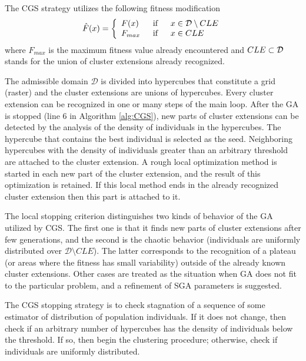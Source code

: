 The CGS strategy utilizes the following fitness modification
\begin{equation}
\label{eqn:FitnessDeterioration_6}
\hat{F}(x) = \left\{
\begin{array}{lll}
F(x) & \; \; \text{if} & \; \; x \in {\cal D} \setminus CLE\\
F_{max} & \; \; \text{if} & \; \; x \in CLE
\end{array}
\right.
\end{equation}
where $F_{max}$ is the maximum fitness value already encountered and 
$CLE \subset {\cal D}$ stands for the union of cluster extensions already recognized. 

The admissible domain $\mathcal{D}$ is divided into hypercubes
that constitute a grid (raster) and the cluster extensions
are unions of hypercubes. Every cluster extension can be recognized
in one or many steps of the main loop. 
After the GA is stopped (line 6 in Algorithm \ref{alg:CGS}), 
new parts of cluster extensions can be detected by the analysis of the density
of individuals in the hypercubes. The hypercube that contains the
best individual is selected as the seed. Neighboring hypercubes with
the density of individuals greater than an arbitrary threshold are
attached to the cluster extension. A rough local optimization method
is started in each new part of the cluster extension, and the result
of this optimization is retained. If this local method ends in the
already recognized cluster extension then this part is attached to it. 

The local stopping criterion distinguishes two kinds of behavior
of the GA utilized by CGS.
The first one is that it finds new parts of cluster extensions after
few generations, and the second is the chaotic behavior
(individuals are uniformly distributed over $\mathcal{D} \setminus CLE$).
The latter corresponds to the recognition of a plateau 
(or areas where the fitness has small variability)
outside of the already known cluster extensions. Other cases are treated
as the situation when GA does not fit to the particular problem, and
a refinement of SGA parameters is suggested.

The CGS stopping strategy is to check stagnation of a sequence
of some estimator of distribution of population individuals. If it does
not change, then check if an arbitrary number of hypercubes has the
density of individuals below the threshold. If so, then begin the clustering
procedure; otherwise, check if individuals are uniformly distributed.

